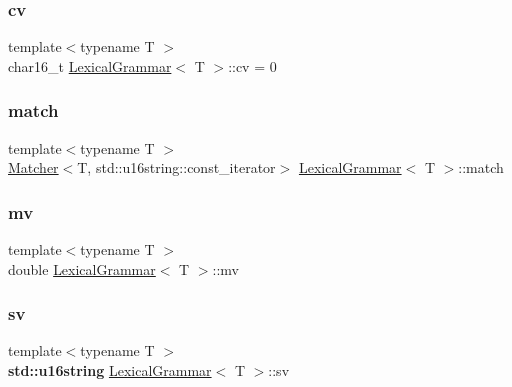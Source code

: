 \mbox{\label{class_lexical_grammar_ad579d5598245aa0ed816102edad07507}} 
\subsubsection{\texorpdfstring{cv}{cv}}
{\footnotesize\ttfamily template$<$typename T $>$ \\
char16\+\_\+t \hyperlink{class_lexical_grammar}{Lexical\+Grammar}$<$ T $>$\+::cv = 0}

\mbox{\label{class_lexical_grammar_a868dc475274f55ff285fd26593f9d0a5}} 
\subsubsection{\texorpdfstring{match}{match}}
{\footnotesize\ttfamily template$<$typename T $>$ \\
\hyperlink{class_matcher}{Matcher}$<$T, std\+::u16string\+::const\+\_\+iterator$>$ \hyperlink{class_lexical_grammar}{Lexical\+Grammar}$<$ T $>$\+::match}

\mbox{\label{class_lexical_grammar_a9e73d081df33b375d2f6e75e1569a31b}} 
\subsubsection{\texorpdfstring{mv}{mv}}
{\footnotesize\ttfamily template$<$typename T $>$ \\
double \hyperlink{class_lexical_grammar}{Lexical\+Grammar}$<$ T $>$\+::mv}

\mbox{\label{class_lexical_grammar_adb7fa78005ee277768cde788efb7a667}} 
\subsubsection{\texorpdfstring{sv}{sv}}
{\footnotesize\ttfamily template$<$typename T $>$ \\
\textbf{ std\+::u16string} \hyperlink{class_lexical_grammar}{Lexical\+Grammar}$<$ T $>$\+::sv}

